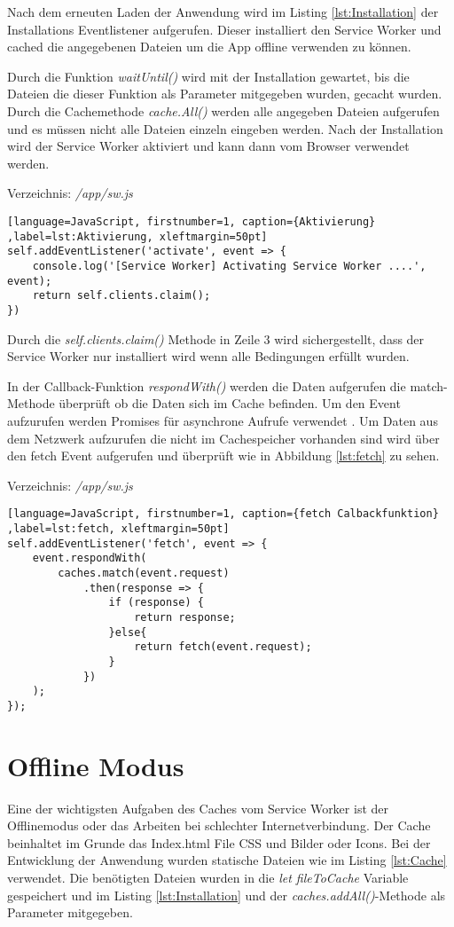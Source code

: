 Nach dem erneuten Laden der Anwendung wird im Listing \ref{lst:Installation} der Installations Eventlistener aufgerufen. Dieser installiert den Service Worker und cached die angegebenen Dateien um die App offline verwenden zu können. 

Durch die Funktion \textit{waitUntil()} wird mit der Installation gewartet, bis die Dateien die dieser Funktion als Parameter mitgegeben wurden, gecacht wurden. Durch die Cachemethode \textit{cache.All()} werden alle angegeben Dateien aufgerufen und es müssen nicht alle Dateien einzeln eingeben werden.
Nach der Installation wird der Service Worker aktiviert und kann dann vom Browser verwendet werden.

Verzeichnis: \textit{/app/sw.js}

\begin{lstlisting}[language=JavaScript, firstnumber=1, caption={Aktivierung} ,label=lst:Aktivierung, xleftmargin=50pt]
self.addEventListener('activate', event => {
    console.log('[Service Worker] Activating Service Worker ....', event);
    return self.clients.claim();
})
\end{lstlisting}

Durch die \textit{self.clients.claim()} Methode in Zeile 3 wird sichergestellt, dass der Service Worker nur installiert wird wenn alle Bedingungen erfüllt wurden.

In der Callback-Funktion \textit{respondWith()} werden die Daten aufgerufen die match-Methode überprüft ob die Daten sich im Cache befinden.
Um den Event aufzurufen werden Promises für asynchrone Aufrufe verwendet .
Um Daten aus dem Netzwerk aufzurufen die nicht im Cachespeicher vorhanden sind wird über den fetch Event aufgerufen und überprüft wie in Abbildung \ref{lst:fetch} zu sehen.

Verzeichnis: \textit{/app/sw.js}

\begin{lstlisting}[language=JavaScript, firstnumber=1, caption={fetch Calbackfunktion} ,label=lst:fetch, xleftmargin=50pt]
self.addEventListener('fetch', event => {
    event.respondWith(
        caches.match(event.request)
            .then(response => {
                if (response) {
                    return response;
                }else{
                    return fetch(event.request);
                }
            })
    );
});
\end{lstlisting}


	 
\clearpage
\section{Offline Modus}
Eine der wichtigsten Aufgaben des Caches vom Service Worker ist der Offlinemodus oder das Arbeiten bei schlechter Internetverbindung. Der Cache beinhaltet im Grunde das Index.html File CSS und Bilder oder Icons. Bei der Entwicklung der Anwendung wurden statische Dateien wie im Listing \ref{lst:Cache} verwendet. Die benötigten Dateien wurden in die \textit{let fileToCache} Variable gespeichert und im Listing \ref{lst:Installation} und der \textit{caches.addAll()}-Methode als Parameter mitgegeben.


